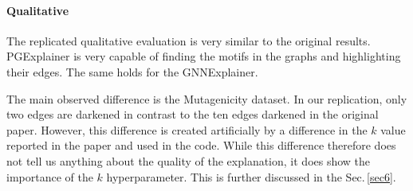 \begin{table}[]
\normalsize
{}
\caption{Results of a small ablation study on the effect of the size and entropy regularization on the AUC score. The ablation study is performed using the Tree-Cycles dataset and follows the setup of the quantitative evaluation. It averages over 10 runs. The results show that the regularization has a large effect on both the quantitative quality of the explanations and their consistency. The best score is shown in bold. }
\label{tab:reg}
\end{table}

\paragraph{Qualitative}
The replicated qualitative evaluation is very similar to the original results. PGExplainer is very capable of finding the motifs in the graphs and highlighting their edges. The same holds for the GNNExplainer. 

The main observed difference is the Mutagenicity dataset. In our replication, only two edges are darkened in contrast to the ten edges darkened in the original paper. However, this difference is created artificially by a difference in the $k$ value reported in the paper and used in the code. While this difference therefore does not tell us anything about the quality of the explanation, it does show the importance of the $k$ hyperparameter. This is further discussed in the Sec.\,\ref{sec6}.


